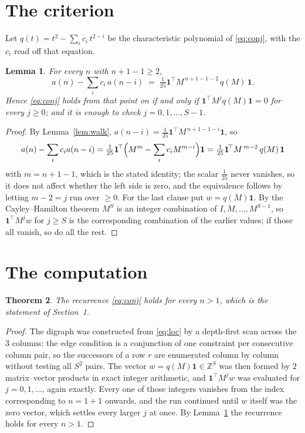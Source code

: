 \documentclass[11pt,a4paper]{article}
\theoremstyle{plain}
\newtheorem{theorem}{Theorem}
\newtheorem{lemma}[theorem]{Lemma}
\theoremstyle{definition}
\begin{document}
\section{The criterion}

Let $q(t)=t^{2}-\sum_i c_i\,t^{2-i}$ be the characteristic polynomial of
\eqref{eq:conj}, with the $c_i$ read off that equation.

\begin{lemma}\label{lem:crit}
For every $n$ with $n+1-1\ge2$,
\[
a(n)-\sum_i c_i\,a(n-i)\;=\;\tfrac1{25}\mathbf{1}^{\!\top}M^{\,n+1-1-2}\,q(M)\,\mathbf{1} .
\]
Hence \eqref{eq:conj} holds from that point on if and only if
$\mathbf{1}^{\!\top}M^{j}q(M)\mathbf{1}=0$ for every $j\ge0$; and it is enough to check
$j=0,1,\dots,S-1$.
\end{lemma}

\begin{proof}
By Lemma~\ref{lem:walk}, $a(n-i)=\tfrac1{25}\mathbf{1}^{\!\top}M^{\,n+1-1-i}\mathbf{1}$, so
\[
a(n)-\sum_i c_i a(n-i)
=\tfrac1{25}\mathbf{1}^{\!\top}\Bigl(M^{m}-\sum_i c_i M^{m-i}\Bigr)\mathbf{1}
=\tfrac1{25}\mathbf{1}^{\!\top}M^{\,m-2}\,q(M)\,\mathbf{1}
\]
with $m=n+1-1$, which is the stated identity; the scalar $\tfrac1{25}$ never vanishes, so it does not affect whether the left side is zero, and the equivalence follows by letting
$m-2=j$ run over $\ge0$. For the last clause put $w=q(M)\mathbf{1}$. By the
Cayley--Hamilton theorem $M^{S}$ is an integer combination of $I,M,\dots,M^{S-1}$, so
$\mathbf{1}^{\!\top}M^{j}w$ for $j\ge S$ is the corresponding combination of the earlier
values; if those all vanish, so do all the rest.
\end{proof}

\section{The computation}

\begin{theorem}
The recurrence \eqref{eq:conj} holds for every $n>1$, which is the statement of
Section~1.
\end{theorem}

\begin{proof}
The digraph was constructed from \eqref{eq:loc} by a depth-first scan across the $3$
columns: the edge condition is a conjunction of one constraint per consecutive column
pair, so the successors of a row $r$ are enumerated column by column without testing all
$S^2$ pairs. The vector $w=q(M)\mathbf{1}\in\mathbb{Z}^{S}$ was then formed by $2$
matrix--vector products in exact integer arithmetic, and $\mathbf{1}^{\!\top}M^{j}w$ was
evaluated for $j=0,1,\dots$, again exactly. Every one of those integers vanishes from the
index corresponding to $n=1+1$ onwards, and the run continued until $w$ itself was the
zero vector, which settles every larger $j$ at once. By Lemma~\ref{lem:crit} the recurrence
holds for every $n>1$.
\end{proof}
\end{document}
